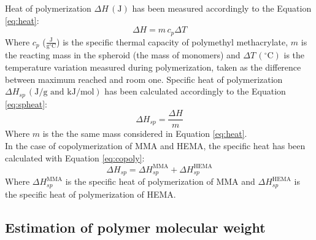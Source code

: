 \documentclass[a4paper, 11pt]{article}
\begin{document}
Heat of polymerization $\Delta H \,(\text{J})$ has been measured accordingly to the Equation \ref{eq:heat}:
\begin{equation}
\Delta H = m \,c_p \Delta T
\label{eq:heat} 
\end{equation}
Where $c_p$ ($\frac{\text{J}}{\text{g}^\circ\text{C}}$) is the specific thermal capacity of polymethyl methacrylate, $m$ is the reacting mass in the spheroid (the mass of monomers) and $\Delta T\,(^\circ\text{C})$ is the temperature variation measured during polymerization, taken as the difference between maximum reached and room one. Specific heat of polymerization $\Delta H_{sp}\,(\text{J}/\text{g} \,\, \text{and} \,\, \text{kJ}/\text{mol})$ has been calculated accordingly to the Equation \ref{eq:spheat}:
\begin{equation}
\Delta H_{sp} = \frac{\Delta H}{m}
\label{eq:spheat} 
\end{equation}
Where $m$ is the the same mass considered in Equation \ref{eq:heat}. \\
In the case of copolymerization of MMA and HEMA, the specific heat has been calculated with Equation \ref{eq:copoly}:
\begin{equation}
\Delta H_{sp} = \Delta H_{sp}^\text{MMA} + \Delta H_{sp}^\text{HEMA}
\label{eq:copoly} 
\end{equation}
Where $\Delta H_{sp}^\text{MMA}$ is the specific heat of polymerization of MMA and $\Delta H_{sp}^\text{HEMA}$ is the specific heat of polymerization of HEMA.

\subsection{Estimation of polymer molecular weight}
\end{document}
